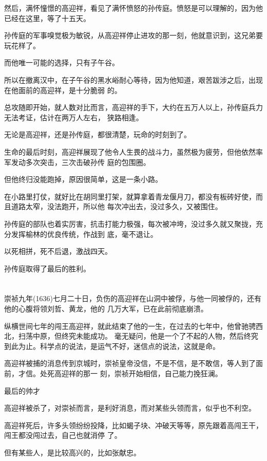 \documentclass[11pt,a4paper,onecolumn]{article}
\begin{document}
然后，满怀憧憬的高迎祥，看见了满怀愤怒的孙传庭。愤怒是可以理解的，因为他已经在这里，等了十五天。

孙传庭的军事嗅觉极为敏锐，从高迎祥停止进攻的那一刻，他就意识到，这兄弟要玩花样了。

而他唯一可能的选择，只有子午谷。

所以在撤离汉中，在子午谷的黑水峪耐心等待，因为他知道，艰苦跋涉之后，出现在他面前的高迎祥，是十分脆弱
的。

总攻随即开始，就人数对比而言，高迎祥的手下，大约在五万人以上，孙传庭兵力无法考证，估计在两万人左右，
狭路相逢。

无论是高迎祥，还是孙传庭，都很清楚，玩命的时刻到了。

生命的最后时刻，高迎祥展现了他令人生畏的战斗力，虽然极为疲劳，但他依然率军发动多次突击，三次击破孙传
庭的包围圈。

但他终归没能跑掉，原因很简单，这是一条小路。

在小路里打仗，就好比在胡同里打架，就算拿着青龙偃月刀，都没有板砖好使，而且道路太窄，没法跑开，所以他
每次冲出去，没过多久，又被围住。

孙传庭的部队也着实厉害，抗击打能力极强，每次被冲垮，没过多久就又聚拢，充分发挥榆林的优良传统，作战到
底，毫不退让。

以死相拼，死不后退，激战四天。

孙传庭取得了最后的胜利。

\section[\thesection]{}

崇祯九年(1636)七月二十日，负伤的高迎祥在山洞中被俘，与他一同被俘的，还有他的心腹将领刘哲、黄龙，他的
几万大军，已在此前彻底崩溃。

纵横世间七年的闯王高迎祥，就此结束了他的一生，在过去的七年中，他曾驰骋西北，扫荡中原，但终究未能成功。
毫无疑问，他是一个了不起的人物，然后终究到此为止。科学点的说法，是运气不好，迷信点的说法，这就是命。

高迎祥被捕的消息传到京城时，崇祯皇帝没信，不是不信，是不敢信，等人到了面前，才信。处死高迎祥的那一
刻，崇祯开始相信，自己能力挽狂澜。

最后的帅才

高迎祥被杀了，对崇祯而言，是利好消息，而对某些头领而言，似乎也不利空。

高迎祥死后，许多头领纷纷投降，比如蝎子块、冲破天等等，原先跟着高闯王干，闯王都没闯过去，自己也就消停
了。

但有某些人，是比较高兴的，比如张献忠。
\end{document}
